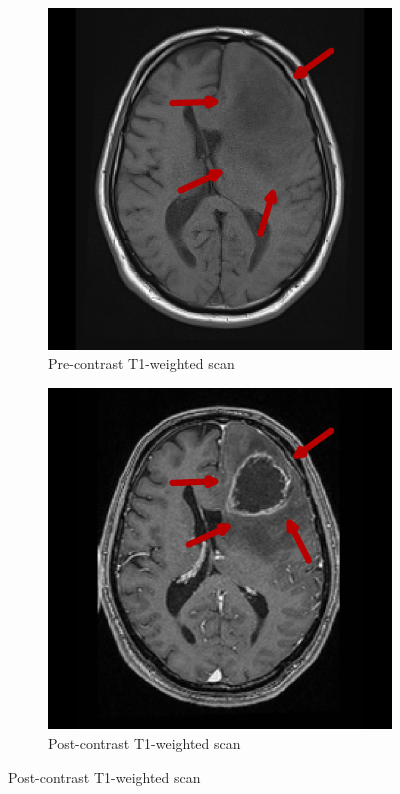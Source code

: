 \begin{figure}[hbt]
    \centering
    \begin{subfigure}[b]{0.45\textwidth}
        \centering
        \includegraphics[width=\textwidth]{Figures/T1_arrows.png}
        \caption{Pre-contrast T1-weighted scan}\label{fig:intro_T1}
    \end{subfigure}
    \begin{subfigure}[b]{0.45\textwidth}
        \centering
        \includegraphics[width=\textwidth]{Figures/T1GD_arrows.png}
        \caption{Post-contrast T1-weighted scan}\label{fig:intro_T1GD}
    \end{subfigure}


\end{figure}
